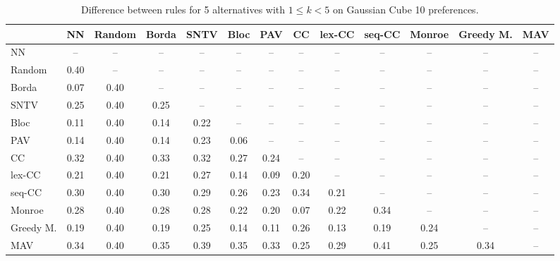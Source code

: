 
\begin{table*}[htbp]
\centering
\begin{tabular}{lcccccccccccc}
\toprule
 & NN & Random & Borda & SNTV & Bloc & PAV & CC & lex-CC & seq-CC & Monroe & Greedy M. & MAV \\
\midrule
NN & -- & -- & -- & -- & -- & -- & -- & -- & -- & -- & -- & -- \\
Random & \cellcolor{blue!40} 0.40 & -- & -- & -- & -- & -- & -- & -- & -- & -- & -- & -- \\
Borda & \cellcolor{blue!7} 0.07 & \cellcolor{blue!40} 0.40 & -- & -- & -- & -- & -- & -- & -- & -- & -- & -- \\
SNTV & \cellcolor{blue!25} 0.25 & \cellcolor{blue!40} 0.40 & \cellcolor{blue!25} 0.25 & -- & -- & -- & -- & -- & -- & -- & -- & -- \\
Bloc & \cellcolor{blue!11} 0.11 & \cellcolor{blue!40} 0.40 & \cellcolor{blue!14} 0.14 & \cellcolor{blue!22} 0.22 & -- & -- & -- & -- & -- & -- & -- & -- \\
PAV & \cellcolor{blue!14} 0.14 & \cellcolor{blue!40} 0.40 & \cellcolor{blue!14} 0.14 & \cellcolor{blue!23} 0.23 & \cellcolor{blue!6} 0.06 & -- & -- & -- & -- & -- & -- & -- \\
CC & \cellcolor{blue!32} 0.32 & \cellcolor{blue!40} 0.40 & \cellcolor{blue!33} 0.33 & \cellcolor{blue!32} 0.32 & \cellcolor{blue!27} 0.27 & \cellcolor{blue!24} 0.24 & -- & -- & -- & -- & -- & -- \\
lex-CC & \cellcolor{blue!21} 0.21 & \cellcolor{blue!40} 0.40 & \cellcolor{blue!21} 0.21 & \cellcolor{blue!27} 0.27 & \cellcolor{blue!14} 0.14 & \cellcolor{blue!9} 0.09 & \cellcolor{blue!20} 0.20 & -- & -- & -- & -- & -- \\
seq-CC & \cellcolor{blue!30} 0.30 & \cellcolor{blue!40} 0.40 & \cellcolor{blue!30} 0.30 & \cellcolor{blue!28} 0.29 & \cellcolor{blue!26} 0.26 & \cellcolor{blue!23} 0.23 & \cellcolor{blue!34} 0.34 & \cellcolor{blue!21} 0.21 & -- & -- & -- & -- \\
Monroe & \cellcolor{blue!28} 0.28 & \cellcolor{blue!40} 0.40 & \cellcolor{blue!28} 0.28 & \cellcolor{blue!28} 0.28 & \cellcolor{blue!22} 0.22 & \cellcolor{blue!20} 0.20 & \cellcolor{blue!7} 0.07 & \cellcolor{blue!22} 0.22 & \cellcolor{blue!34} 0.34 & -- & -- & -- \\
Greedy M. & \cellcolor{blue!19} 0.19 & \cellcolor{blue!40} 0.40 & \cellcolor{blue!19} 0.19 & \cellcolor{blue!25} 0.25 & \cellcolor{blue!14} 0.14 & \cellcolor{blue!11} 0.11 & \cellcolor{blue!26} 0.26 & \cellcolor{blue!13} 0.13 & \cellcolor{blue!19} 0.19 & \cellcolor{blue!24} 0.24 & -- & -- \\
MAV & \cellcolor{blue!34} 0.34 & \cellcolor{blue!40} 0.40 & \cellcolor{blue!35} 0.35 & \cellcolor{blue!39} 0.39 & \cellcolor{blue!35} 0.35 & \cellcolor{blue!33} 0.33 & \cellcolor{blue!25} 0.25 & \cellcolor{blue!28} 0.29 & \cellcolor{blue!41} 0.41 & \cellcolor{blue!25} 0.25 & \cellcolor{blue!34} 0.34 & -- \\
\bottomrule
\end{tabular}

\caption{Difference between rules for 5 alternatives with $1 \leq k < 5$ on Gaussian Cube 10 preferences.}
\label{tab:rule_distance_heatmap-m=[5]-pref_dist=euclidean__args__dimensions=10_-_space=gaussian_cube}
\end{table*}
    